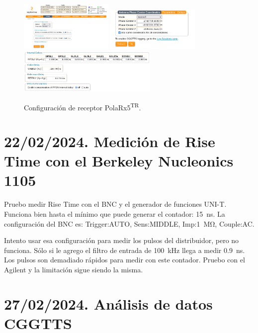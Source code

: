 \documentclass[11pt]{article}
\newcommand{\polar}[0]{PolaRx5\textsuperscript{TR}}
\newcommand{\BNC}[0]{Berkeley Nucleonics 1105}
\begin{document}
\begin{figure}[ht]
    \begin{center}
        \includegraphics[width=0.4\textwidth]{./figuras/Screenshot from 2024-02-22 17-20-29.png}
        \includegraphics[width=0.4\textwidth]{./figuras/Screenshot from 2024-02-22 17-21-05.png}
        \includegraphics[width=0.6\textwidth]{./figuras/Screenshot from 2024-02-22 17-21-41.png}
        \caption{Configuración de receptor \polar.}
        \label{fig:22feb24}
    \end{center}
\end{figure}

\section{22/02/2024. Medición de Rise Time con el \BNC}
Pruebo medir Rise Time con el BNC y el generador de funciones UNI-T. Funciona bien hasta el mínimo que puede generar el contador: \SI{15}{\nano\second}. La configuración del BNC es: Trigger:AUTO, Sens:MIDDLE, Imp:\SI{1}{\mega\ohm}, Couple:AC.

Intento usar esa configuración para medir los pulsos del distribuidor, pero no funciona. Sólo si le agrego el filtro de entrada de \SI{100}{\kilo\hertz} llega a medir \SI{0.9}{\nano\second}. Los pulsos son demadiado rápidos para medir con este contador. Pruebo con el Agilent y la limitación sigue siendo la misma.

\section{27/02/2024. Análisis de datos CGGTTS}
\end{document}
